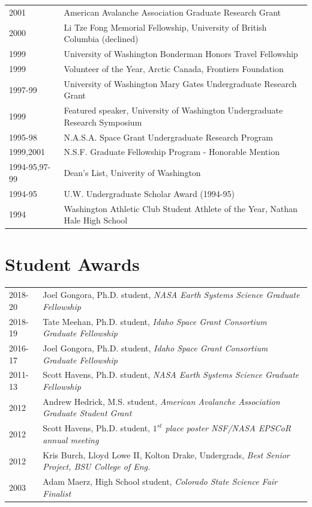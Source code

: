 \documentclass[11pt]{article}
\begin{document}
\begin{tabular}{ll}
2001 & American Avalanche Association Graduate Research Grant \\
2000 & Li Tze Fong Memorial Fellowship, University of British Columbia (declined) \\
1999 & University of Washington Bonderman Honors Travel Fellowship \\
1999 & Volunteer of the Year, Arctic Canada, Frontiers Foundation \\
1997-99 & University of Washington Mary Gates Undergraduate Research Grant \\
1999 & Featured speaker, University of Washington Undergraduate Research Symposium \\
1995-98 & N.A.S.A. Space Grant Undergraduate Research Program \\
1999,2001 & N.S.F. Graduate Fellowship Program - Honorable Mention \\
1994-95,97-99 & Dean's List, Univerity of Washington \\
1994-95 & U.W. Undergraduate Scholar Award (1994-95) \\
1994 & Washington Athletic Club Student Athlete of the Year, Nathan Hale High School \\
\end{tabular}

\section*{Student Awards}
\begin{tabular}{ll}
2018-20 & Joel Gongora, Ph.D. student, \textit{NASA Earth Systems Science Graduate Fellowship} \\
2018-19 & Tate Meehan, Ph.D. student, \textit{Idaho Space Grant Consortium  Graduate Fellowship} \\
2016-17 & Joel Gongora, Ph.D. student, \textit{Idaho Space Grant Consortium  Graduate Fellowship} \\
2011-13 & Scott Havens, Ph.D. student, \textit{NASA Earth Systems Science Graduate Fellowship} \\
2012 & Andrew Hedrick, M.S. student, \textit{American Avalanche Association Graduate Student Grant} \\
2012 & Scott Havens, Ph.D. student, \textit{$1^{st}$ place poster NSF/NASA EPSCoR annual meeting} \\
2012 & Kris Burch, Lloyd Lowe II, Kolton Drake, Undergrads, \textit{Best Senior Project, BSU College of Eng.} \\
2003 & Adam Maerz, High School student, \textit{Colorado State Science Fair Finalist}
\end{tabular}
\end{document}
